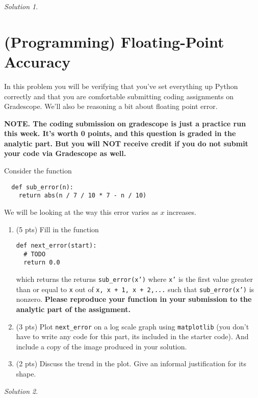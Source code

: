 \documentclass{article}
\theoremstyle{remark}
\newtheorem*{solution}{Solution}
\begin{document}
\begin{solution}
\end{solution}

\pagebreak
\section{(Programming) Floating-Point Accuracy}

In this problem you will be verifying that you've set everything up Python correctly and that you are comfortable submitting coding assignments on Gradescope.
We'll also be reasoning a bit about floating point error.

\textbf{NOTE. The coding submission on gradescope is just a practice run this week. It's worth 0 points, and this question is graded in the analytic part. But you will NOT receive credit if you do not submit your code via Gradescope as well.}

Consider the function
\begin{lstlisting}
  def sub_error(n):
    return abs(n / 7 / 10 * 7 - n / 10)
\end{lstlisting}
We will be looking at the way this error varies as $x$ increases.
\begin{enumerate}
\item (5 pts) Fill in the function
\begin{lstlisting}
def next_error(start):
  # TODO
  return 0.0
\end{lstlisting}
which returns the returns \texttt{sub\_error(x')} where \texttt{x'} is the first value greater than or equal to \texttt{x} out of \texttt{x, x + 1, x + 2,...} such that \texttt{sub\_error(x')} is nonzero.
\textbf{Please reproduce your function in your submission to the analytic part of the assignment.}

\item (3 pts) Plot \texttt{next\_error} on a log scale graph using \texttt{matplotlib} (you don't have to write any code for this part, its included in the starter code). And include a copy of the image produced in your solution.

\item (2 pts) Discuss the trend in the plot. Give an informal justification for its shape.
\end{enumerate}

\begin{solution}
\end{solution}
\end{document}

